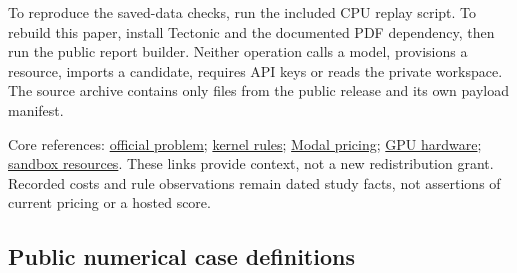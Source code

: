 \documentclass[11pt,letterpaper]{article}
\begin{document}
To reproduce the saved-data checks, run the included CPU replay script. To rebuild this paper, install Tectonic and the documented PDF dependency, then run the public report builder. Neither operation calls a model, provisions a resource, imports a candidate, requires API keys or reads the private workspace. The source archive contains only files from the public release and its own payload manifest.

Core references: \href{https://openkernelchallenge.dev/problems/muse_attention_decode}{official problem}; \href{https://openkernelchallenge.dev/rules\#kernels}{kernel rules}; \href{https://modal.com/pricing}{Modal pricing}; \href{https://modal.com/docs/guide/gpu}{GPU hardware}; \href{https://modal.com/docs/guide/resources}{sandbox resources}. These links provide context, not a new redistribution grant. Recorded costs and rule observations remain dated study facts, not assertions of current pricing or a hosted score.

\clearpage\subsection{Public numerical case definitions}
\end{document}
